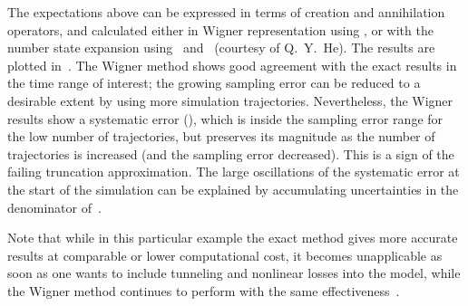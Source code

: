 The expectations above can be expressed in terms of creation and annihilation operators, and calculated either in Wigner representation using , or with the number state expansion using~ and~ (courtesy of Q.~Y.~He).
The results are plotted in~.
The Wigner method shows good agreement with the exact results in the time range of interest; the growing sampling error can be reduced to a desirable extent by using more simulation trajectories.
Nevertheless, the Wigner results show a systematic error (), which is inside the sampling error range for the low number of trajectories, but preserves its magnitude as the number of trajectories is increased (and the sampling error decreased).
This is a sign of the failing truncation approximation.
The large oscillations of the systematic error at the start of the simulation can be explained by accumulating uncertainties in the denominator of~.

Note that while in this particular example the exact method gives more accurate results at comparable or lower computational cost, it becomes unapplicable as soon as one wants to include tunneling and nonlinear losses into the model, while the Wigner method continues to perform with the same effectiveness~\cite{Opanchuk2012a}.
